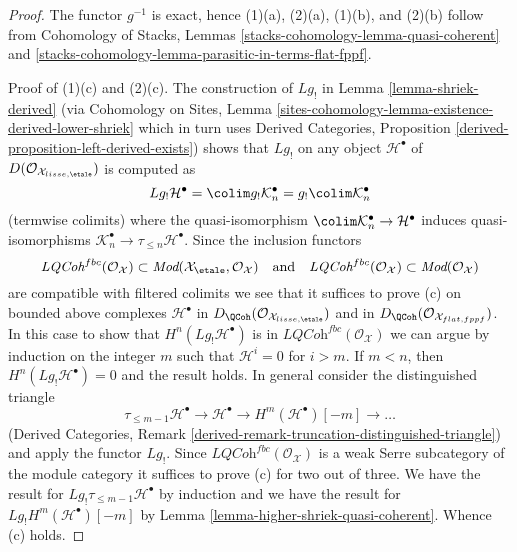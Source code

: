 \begin{proof}
The functor $g^{-1}$ is exact, hence (1)(a), (2)(a), (1)(b), and (2)(b)
follow from Cohomology of Stacks,
Lemmas \ref{stacks-cohomology-lemma-quasi-coherent} and
\ref{stacks-cohomology-lemma-parasitic-in-terms-flat-fppf}.

\medskip\noindent
Proof of (1)(c) and (2)(c).
The construction of $Lg_!$ in Lemma \ref{lemma-shriek-derived}
(via Cohomology on Sites,
Lemma \ref{sites-cohomology-lemma-existence-derived-lower-shriek}
which in turn uses
Derived Categories, Proposition \ref{derived-proposition-left-derived-exists})
shows that $Lg_!$ on any object $\mathcal{H}^\bullet$ of
$D(\mathcal{O}_{\mathcal{X}_{lisse,\etale}})$ is computed
as
$$
Lg_!\mathcal{H}^\bullet = \colim g_!\mathcal{K}_n^\bullet =
g_! \colim \mathcal{K}_n^\bullet
$$
(termwise colimits) where the quasi-isomorphism
$\colim \mathcal{K}_n^\bullet \to \mathcal{H}^\bullet$
induces quasi-isomorphisms
$\mathcal{K}_n^\bullet \to \tau_{\leq n} \mathcal{H}^\bullet$.
Since the inclusion functors
$$
\textit{LQCoh}^{fbc}(\mathcal{O}_\mathcal{X}) \subset
\textit{Mod}(\mathcal{X}_\etale, \mathcal{O}_\mathcal{X})
\quad\text{and}\quad
\textit{LQCoh}^{fbc}(\mathcal{O}_\mathcal{X}) \subset
\textit{Mod}(\mathcal{O}_\mathcal{X})
$$
are compatible with filtered colimits we see that it suffices to prove (c)
on bounded above complexes $\mathcal{H}^\bullet$ in
$D_\QCoh(\mathcal{O}_{\mathcal{X}_{lisse,\etale}})$ and in
$D_\QCoh(\mathcal{O}_{\mathcal{X}_{flat,fppf}})$.
In this case to show that $H^n(Lg_!\mathcal{H}^\bullet)$ is
in $\textit{LQCoh}^{fbc}(\mathcal{O}_\mathcal{X})$
we can argue by induction on the integer
$m$ such that $\mathcal{H}^i = 0$ for $i > m$. If $m < n$, then
$H^n(Lg_!\mathcal{H}^\bullet) = 0$ and the result holds. In general
consider the distinguished triangle
$$
\tau_{\leq m - 1}\mathcal{H}^\bullet \to \mathcal{H}^\bullet \to
H^m(\mathcal{H}^\bullet)[-m] \to \ldots
$$
(Derived Categories, Remark
\ref{derived-remark-truncation-distinguished-triangle})
and apply the functor $Lg_!$. Since
$\textit{LQCoh}^{fbc}(\mathcal{O}_\mathcal{X})$
is a weak Serre subcategory of the module category it suffices to
prove (c) for two out of three. We have the result for
$Lg_!\tau_{\leq m - 1}\mathcal{H}^\bullet$ by induction and we
have the result for $Lg_!H^m(\mathcal{H}^\bullet)[-m]$ by
Lemma \ref{lemma-higher-shriek-quasi-coherent}. Whence (c) holds.


\end{proof}
